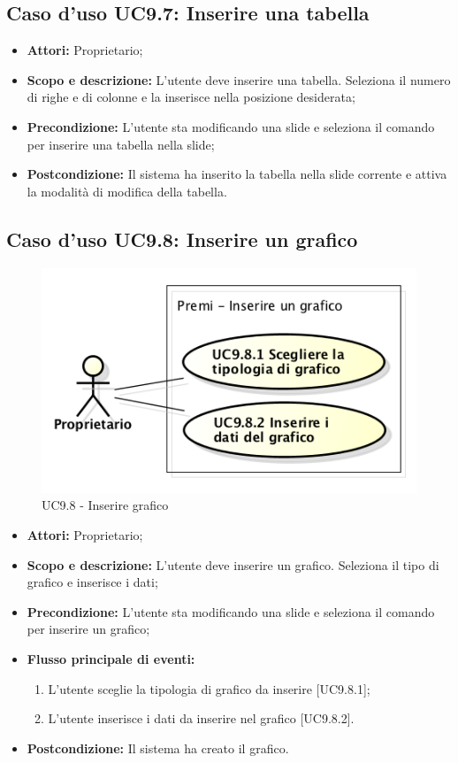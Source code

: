 \subsection{Caso d'uso UC9.7: Inserire una tabella}
\begin{itemize}
	\item \textbf{Attori:} Proprietario;
	\item \textbf{Scopo e descrizione:} L'utente deve inserire una tabella. Seleziona il numero di righe e di colonne e la inserisce nella posizione desiderata;
	\item \textbf{Precondizione:} L'utente sta modificando una \gls{slide} e seleziona il comando per inserire una tabella nella \gls{slide};
	\item \textbf{Postcondizione:} Il sistema ha inserito la tabella nella \gls{slide} corrente e attiva la modalità di modifica della tabella.
\end{itemize}


\subsection{Caso d'uso UC9.8: Inserire un grafico}
\begin{figure}[h] 
	\centering 
	\includegraphics[scale=0.45] {img/UC9.8.png}
	\caption{UC9.8 - Inserire grafico} 
\end{figure}

\begin{itemize}
	\item \textbf{Attori:} Proprietario;
	\item \textbf{Scopo e descrizione:} L'utente deve inserire un grafico. Seleziona il tipo di grafico e inserisce i dati;
	\item \textbf{Precondizione:} L'utente sta modificando una \gls{slide} e seleziona il comando per inserire un grafico;
	\item \textbf{Flusso principale di eventi:}
	\begin{enumerate}
		\item L'utente sceglie la tipologia di grafico da inserire [UC9.8.1];
		\item L'utente inserisce i dati da inserire nel grafico [UC9.8.2].
	\end{enumerate}
	\item \textbf{Postcondizione:} Il sistema ha creato il grafico.
\end{itemize}

